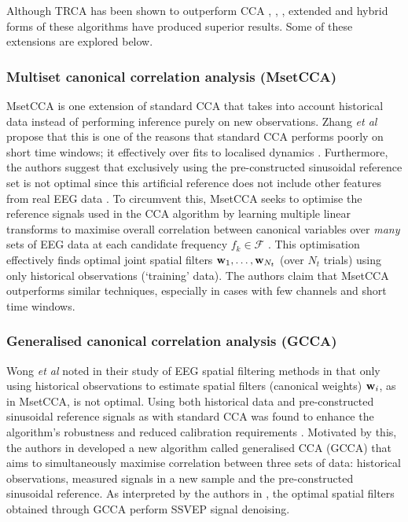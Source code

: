 Although TRCA has been shown to outperform CCA \cite{lee-trca-2step}, \cite{miao-hybrid-cca}, \cite{sun-gcca}, extended and hybrid forms of these algorithms have produced superior results. Some of these extensions are explored below.

\subsubsection{Multiset canonical correlation analysis (MsetCCA)}
\label{subsection:mset-cca-c2}
MsetCCA is one extension of standard CCA that takes into account historical data instead of performing inference purely on new observations. Zhang \textit{et al} propose that this is one of the reasons that standard CCA performs poorly on short time windows; it effectively over fits to localised dynamics \cite{zhang-mset-cca}. Furthermore, the authors suggest that exclusively using the pre-constructed sinusoidal reference set is not optimal since this artificial reference does not include other features from real EEG data \cite{zhang-mset-cca}. To circumvent this, MsetCCA seeks to optimise the reference signals used in the CCA algorithm by learning multiple linear transforms to maximise overall correlation between canonical variables over \textit{many} sets of EEG data at each candidate frequency $f_k \in \mathcal{F}$ \cite{zhang-mset-cca}. This optimisation effectively finds optimal joint spatial filters ${\mathbf{w}}_1, \dots, {\mathbf{w}}_{N_t}$ (over $N_t$ trials) using only historical observations (`training' data). The authors claim that MsetCCA outperforms similar techniques, especially in cases with few channels and short time windows. 

\subsubsection{Generalised canonical correlation analysis (GCCA)}
\label{subsection:gcca-c2}
Wong \textit{et al} noted in their study of EEG spatial filtering methods in \cite{wong-spatial-filt} that only using historical observations to estimate spatial filters (canonical weights) ${\mathbf{w}}_i$, as in MsetCCA, is not optimal. Using both historical data and pre-constructed sinusoidal reference signals as with standard CCA was found to enhance the algorithm's robustness and reduced calibration requirements \cite{wong-spatial-filt}.  Motivated by this, the authors in \cite{sun-gcca} developed a new algorithm called generalised CCA (GCCA) that aims to simultaneously maximise correlation between three sets of data: historical observations, measured signals in a new sample and the pre-constructed sinusoidal reference. As interpreted by the authors in \cite{sun-gcca}, the optimal spatial filters obtained through GCCA perform SSVEP signal denoising.

